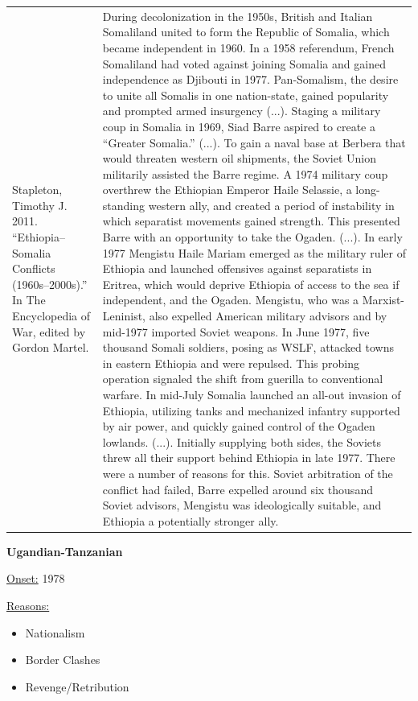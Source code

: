 {\begin{longtable}{p{}p{}}
\\
Stapleton, Timothy J. 2011. “Ethiopia–Somalia Conflicts (1960s–2000s).” In The Encyclopedia of War, edited by Gordon Martel. & During decolonization in the 1950s, British and Italian Somaliland united to form the Republic of Somalia, which became independent in 1960. In a 1958 referendum, French Somaliland had voted against joining Somalia and gained independence as Djibouti in 1977. Pan-Somalism, the desire to unite all Somalis in one nation-state, gained popularity and prompted armed insurgency (...). Staging a military coup in Somalia in 1969, Siad Barre aspired to create a “Greater Somalia.” (...). To gain a naval base at Berbera that would threaten western oil shipments, the Soviet Union militarily assisted the Barre regime. A 1974 military coup overthrew the Ethiopian Emperor Haile Selassie, a long-standing western ally, and created a period of instability in which separatist movements gained strength. This presented Barre with an opportunity to take the Ogaden. (...). 
In early 1977 Mengistu Haile Mariam emerged as the military ruler of Ethiopia and launched offensives against separatists in Eritrea, which would deprive Ethiopia of access to the sea if independent, and the Ogaden. Mengistu, who was a Marxist-Leninist, also expelled American military advisors and by mid-1977 imported Soviet weapons. In June 1977, five thousand Somali soldiers, posing as WSLF, attacked towns in eastern Ethiopia and were repulsed. This probing operation signaled the shift from guerilla to conventional warfare. In mid-July Somalia launched an all-out invasion of Ethiopia, utilizing tanks and mechanized infantry supported by air power, and quickly gained control of the Ogaden lowlands. (...). Initially supplying both sides, the Soviets threw all their support behind Ethiopia in late 1977. There were a number of reasons for this. Soviet arbitration of the conflict had failed, Barre expelled around six thousand Soviet advisors, Mengistu was ideologically suitable, and Ethiopia a potentially stronger ally.

\\
\end{longtable}}
\clearpage
         \textbf{Ugandian-Tanzanian} 

          \underline{Onset:} 1978         

\underline{Reasons:}
\begin{itemize}
\item Nationalism
\item Border Clashes
\item Revenge/Retribution
\end{itemize}

